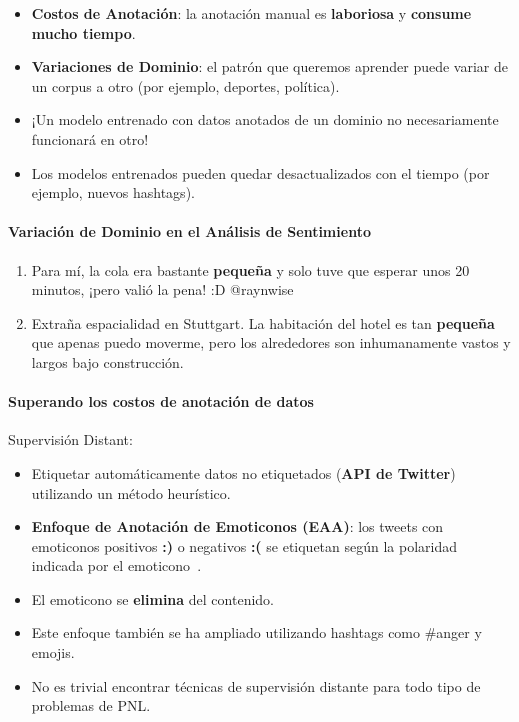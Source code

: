 \documentclass{book}
\begin{document}
\begin{itemize}
   \item \textbf{Costos de Anotación}: la anotación manual es \textbf{laboriosa} y \textbf{consume mucho tiempo}.
   \item \textbf{Variaciones de Dominio}: el patrón que queremos aprender puede variar de un corpus a otro (por ejemplo, deportes, política).

   \item ¡Un modelo entrenado con datos anotados de un dominio no necesariamente funcionará en otro!
   \item Los modelos entrenados pueden quedar desactualizados con el tiempo (por ejemplo, nuevos hashtags).
\end{itemize}

\paragraph{Variación de Dominio en el Análisis de Sentimiento}
\begin{enumerate}
   \item Para mí, la cola era bastante \textcolor[rgb]{0.00,0.00,1.00}{\textbf{pequeña}} y solo tuve que esperar unos 20 minutos, ¡pero valió la pena! :D @raynwise
   \item Extraña espacialidad en Stuttgart. La habitación del hotel es tan \textcolor[rgb]{1.00,0.00,0.00}{\textbf{pequeña}} que apenas puedo moverme, pero los alrededores son inhumanamente vastos y largos bajo construcción.
\end{enumerate}

\paragraph{Superando los costos de anotación de datos}
Supervisión Distant:
\begin{itemize}
   \item Etiquetar automáticamente datos no etiquetados (\textbf{API de Twitter}) utilizando un método heurístico.
   \item \textbf{Enfoque de Anotación de Emoticonos (EAA)}: los tweets con emoticonos positivos \textcolor[rgb]{0.00,0.00,1.00}{\textbf{:)}} o negativos \textcolor[rgb]{1.00,0.00,0.00}{\textbf{:(}} se etiquetan según la polaridad indicada por el emoticono~\cite{Read2005}.
   \item El emoticono se \textbf{elimina} del contenido.
   \item Este enfoque también se ha ampliado utilizando hashtags como \#anger y emojis.
   \item No es trivial encontrar técnicas de supervisión distante para todo tipo de problemas de PNL.
\end{itemize}
\end{document}
